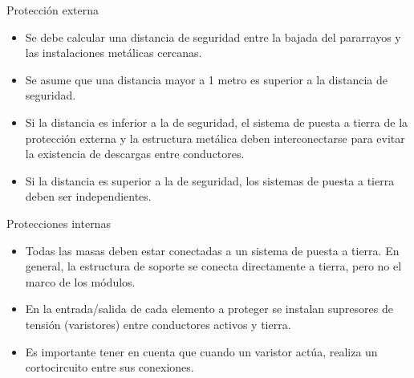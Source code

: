 \documentclass[xcolor={usenames,svgnames,dvipsnames}]{beamer}
\begin{document}
\begin{frame}[label=sec-4-2-4]{Protección externa}
\begin{itemize}
\item Se debe calcular una \alert{distancia de seguridad} entre la bajada del
pararrayos y las instalaciones metálicas cercanas.

\item Se asume que una distancia mayor a 1 metro es superior a la distancia
de seguridad.

\item \alert{Si la distancia es inferior a la de seguridad}, el sistema de puesta
a tierra de la protección externa y la estructura metálica deben
\alert{interconectarse} para evitar la existencia de descargas entre
conductores.

\item \alert{Si la distancia es superior a la de seguridad}, los sistemas de
puesta a tierra deben ser \alert{independientes}.
\end{itemize}
\end{frame}

\begin{frame}[label=sec-4-2-5]{Protecciones internas}
\begin{itemize}
\item \alert{Todas las masas deben estar conectadas a un sistema de puesta a
tierra}. En general, la estructura de soporte se conecta directamente
a tierra, pero no el marco de los módulos.

\item En la entrada/salida de cada elemento a proteger se instalan
\alert{supresores de tensión (varistores)} entre conductores activos y
tierra.

\item Es importante tener en cuenta que cuando un varistor actúa, realiza
un cortocircuito entre sus conexiones.
\end{itemize}
\end{frame}
\end{document}
